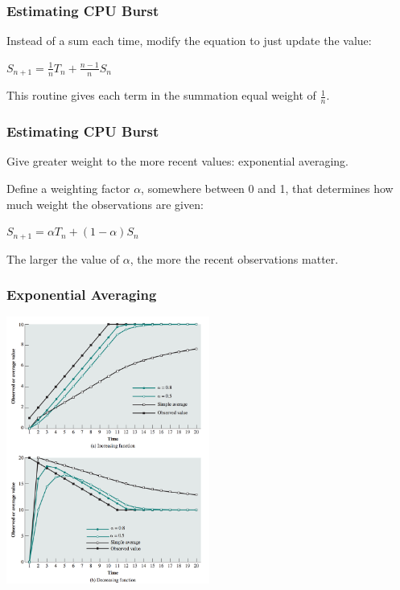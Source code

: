 \begin{frame}
\frametitle{Estimating CPU Burst}

Instead of a sum each time, modify the equation to just update the value:

\begin{center}
$S_{n+1} = \frac{1}{n}T_{n} + \frac{n - 1}{n} S_{n}$
\end{center}

This routine gives each term in the summation equal weight of $\frac{1}{n}$. 

\end{frame}


\begin{frame}
\frametitle{Estimating CPU Burst}

Give greater weight to the more recent values: exponential averaging. 

Define a weighting factor $\alpha$, somewhere between 0 and 1, that determines how much weight the observations are given:

\begin{center}
$S_{n+1} = \alpha T_{n} + (1 - \alpha) S_{n}$
\end{center}

The larger the value of $\alpha$, the more the recent observations matter.

\end{frame}

\begin{frame}
\frametitle{Exponential Averaging}

\begin{center}
	\includegraphics[width=0.5\textwidth]{images/exponential-averaging.png}
\end{center}

\end{frame}

